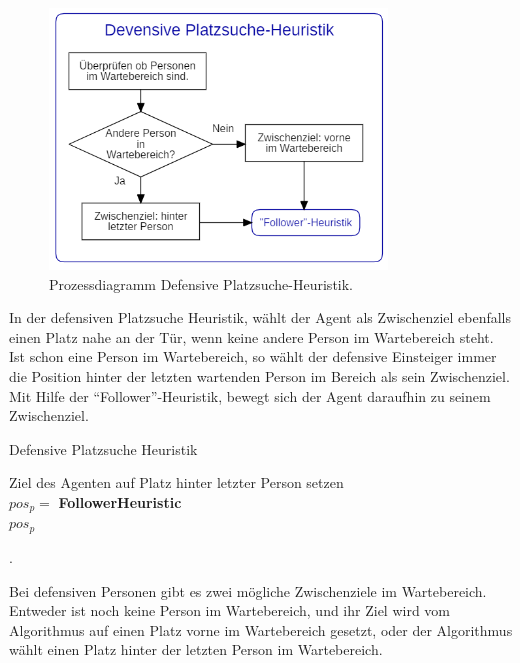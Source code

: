 \begin{figure}[H]
	\centering
		\includegraphics[width=0.8\textwidth]{pictures/model/algorithm/boarding/defensive_boarding/defensive_space_find_heuristic.png}
	\caption{Prozessdiagramm Defensive Platzsuche-Heuristik.}
	\label{fig:DPH}
\end{figure}
In der defensiven Platzsuche Heuristik, wählt der Agent als Zwischenziel ebenfalls einen Platz nahe an der Tür, wenn keine andere Person im Wartebereich steht. Ist schon eine Person im Wartebereich, so wählt der defensive Einsteiger immer die Position hinter der letzten wartenden Person im Bereich als sein Zwischenziel. Mit Hilfe der "`Follower"'-Heuristik, bewegt sich der Agent daraufhin zu seinem Zwischenziel. \\
\begin{algorithm} [H]
	\caption{Defensive Platzsuche Heuristik}
	
	\DefensiveSpaceFindHeuristic{} {
		 {
			Ziel des Agenten auf Platz hinter letzter Person setzen\\
		} 
		$pos_p = $ \textbf{FollowerHeuristic} \\
		\Return $pos_p$
	}
\end{algorithm}.

Bei defensiven Personen gibt es zwei mögliche Zwischenziele im Wartebereich. Entweder ist noch keine Person im Wartebereich, und ihr Ziel wird vom Algorithmus auf einen Platz vorne im Wartebereich gesetzt, oder der Algorithmus wählt einen Platz hinter der letzten Person im Wartebereich.
